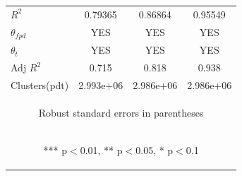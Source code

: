\documentclass[]{article}
\begin{document}
\begin{center}
\begin{tabular}{lccc}
$R^2$ & 0.79365 & 0.86864 & 0.95549 \\
$\theta_{fpd}$ & YES & YES & YES \\
$\theta_t$ & YES & YES & YES \\
Adj $R^2$ & 0.715 & 0.818 & 0.938 \\
 Clusters(pdt) & 2.993e+06 & 2.986e+06 & 2.986e+06 \\ \hline
\multicolumn{4}{c}{\begin{footnotesize} Robust standard errors in parentheses\end{footnotesize}} \\
\multicolumn{4}{c}{\begin{footnotesize} *** p$<$0.01, ** p$<$0.05, * p$<$0.1\end{footnotesize}} \\
\end{tabular}
\end{center}
\end{document}
